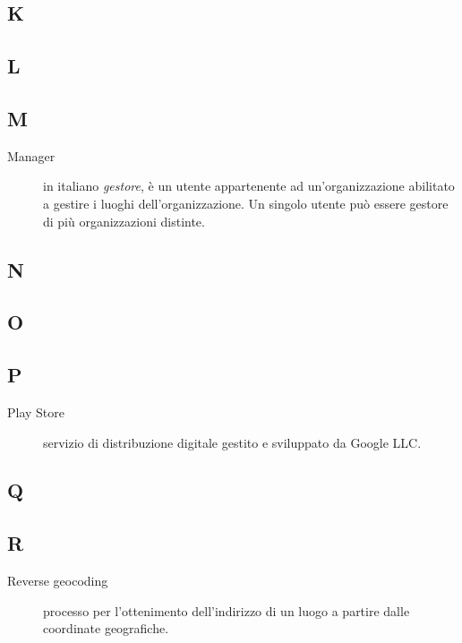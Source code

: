 \documentclass[../../../analisi-dei-requisiti.tex]{subfiles}
\begin{document}
\subsection{K}

\subsection{L}

\subsection{M}
\begin{description}
    \item[Manager] in italiano \textit{gestore}, è un utente appartenente ad un'organizzazione abilitato a gestire i luoghi dell'organizzazione. Un singolo utente può essere gestore di più organizzazioni distinte.
\end{description}

\subsection{N}

\subsection{O}

\subsection{P}
\begin{description}
    \item[Play Store] servizio di distribuzione digitale gestito e sviluppato da Google LLC\@.
\end{description}

\subsection{Q}

\subsection{R}
\begin{description}
    \item[Reverse geocoding] processo per l'ottenimento dell'indirizzo di un luogo a partire dalle coordinate geografiche.
\end{description}
\end{document}
